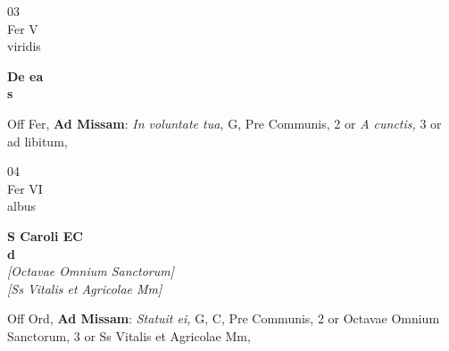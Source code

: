 \documentclass[10pt, openany]{book}
\begin{document}
        \begin{center}
            \begin{minipage}{3.5in}
                \vspace{2em}
                \begin{minipage}{0.5in}
                    {\Huge 03} \\
                    {\normalsize Fer V} \\
                    {\normalsize viridis}
                \end{minipage}
                \begin{minipage}{3.0in}
                    \textbf{ \large De ea \\
                    \textnormal{\normalsize s}} \\ 
                \end{minipage}
                \begin{justify}Off Fer, \textbf{Ad Missam}: \textit{In voluntate tua,} G, Pre Communis, 2 or \textit{A cunctis,} 3 or ad libitum,   
                \end{justify}
            \end{minipage}
        \end{center}
    
        \begin{center}
            \begin{minipage}{3.5in}
                \vspace{2em}
                \begin{minipage}{0.5in}
                    {\Huge 04} \\
                    {\normalsize Fer VI} \\
                    {\normalsize albus}
                \end{minipage}
                \begin{minipage}{3.0in}
                    \textbf{ \large S Caroli EC \\
                    \textnormal{\normalsize d}} \\ \textit{[Octavae Omnium Sanctorum]} \\ \textit{[Ss Vitalis et Agricolae Mm]} \\ 
                \end{minipage}
                \begin{justify}Off Ord, \textbf{Ad Missam}: \textit{Statuit ei,} G, C, Pre Communis, 2 or Octavae Omnium Sanctorum, 3 or Ss Vitalis et Agricolae Mm,   
                \end{justify}
            \end{minipage}
        \end{center}
    
\end{document}
